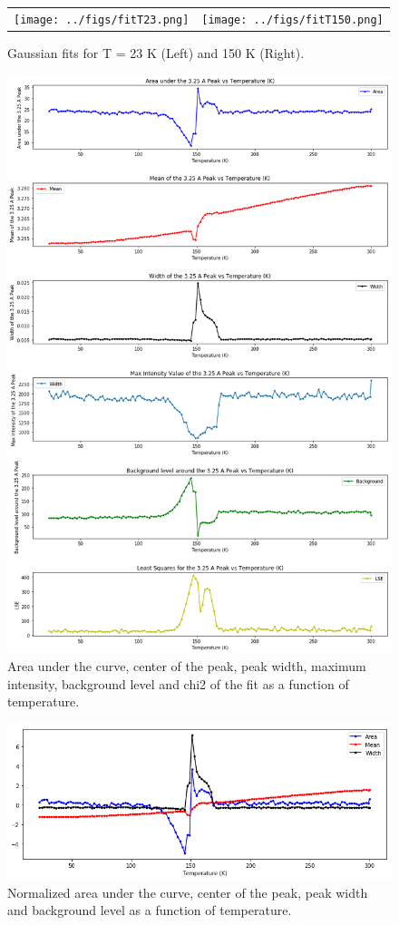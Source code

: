 	\begin{figure}[h]
	\begin{tabular}{ll}
	\texttt{[image: ../figs/fitT23.png]}
	&
	\hspace{5mm}
	\texttt{[image: ../figs/fitT150.png]}
	\end{tabular}
	\caption{Gaussian fits for T = 23 K (Left) and 150 K (Right).}
	\label{fig:fitsT}
	\end{figure}
	
	\begin{figure}[H]
	\centering
	\includegraphics[scale=0.25]{../figs/3p25.png}	
	\caption{Area under the curve, center of the peak, peak width, maximum intensity, background level and chi2 of the fit as a function of temperature.}
	\label{fig:peak3p25}
	\end{figure}

	\begin{figure}[H]
	\centering
	\includegraphics[scale=0.3]{../figs/norm.png}	
	\caption{Normalized area under the curve, center of the peak, peak width and background level as a function of temperature.}
	\label{fig:norm}
	\end{figure}
